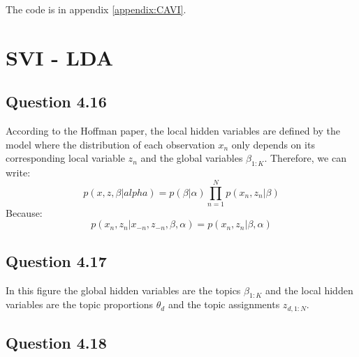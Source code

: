 \documentclass{article}
\begin{document}
The code is in appendix \ref{appendix:CAVI}.

\section{SVI - LDA}

\subsection{Question 4.16}

According to the Hoffman paper, the local hidden variables are defined by the model where the distribution of each observation $x_n$ only depends on its corresponding local variable $z_n$ and the global variables $\beta_{1:K}$.
Therefore, we can write:
\begin{equation}
    p(x, z, \beta | alpha) = p(\beta | \alpha) \prod_{n=1}^{N}p(x_n, z_n | \beta)
\end{equation}
Because:
\begin{equation}
    p(x_n, z_n | x_{-n}, z_{-n}, \beta, \alpha) = p(x_n, z_n | \beta, \alpha)
\end{equation}

\subsection{Question 4.17}

In this figure the global hidden variables are the topics $\beta_{1:K}$ and the local hidden variables are the topic proportions $\theta_d$ and the topic assignments $z_{d,1:N}$.

\subsection{Question 4.18}
\end{document}
